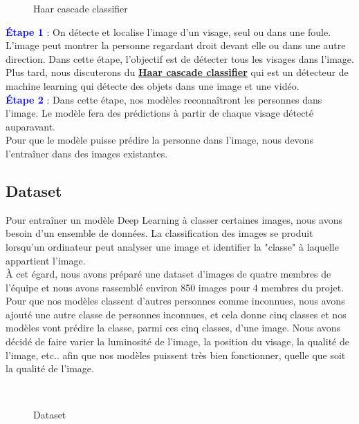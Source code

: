 {%
\begin{figure}
\centering
{}
\caption{Haar cascade classifier}
\label{fig:figure3}
\end{figure} 
\textbf{\textcolor{blue}{Étape 1}} : On détecte et localise l'image d'un visage, seul ou dans une foule. L'image peut montrer la personne regardant droit devant elle ou dans une autre direction. Dans cette étape, l'objectif est de détecter tous les visages dans l'image. Plus tard, nous discuterons du \textbf{\hyperref[sec:haar]{Haar cascade classifier}} qui est un détecteur de machine learning qui détecte des objets dans une image et une vidéo.\\[1.5cm]

\textbf{\textcolor{blue}{Étape 2}} : Dans cette étape, nos modèles reconnaîtront les personnes dans l'image. Le modèle fera des prédictions à partir de chaque visage détecté auparavant.\\


Pour que le modèle puisse prédire la personne dans l'image, nous devons l'entraîner dans des images existantes.


\subsection{Dataset}
Pour entraîner un modèle Deep Learning à classer certaines images, nous avons besoin d'un ensemble de données. La classification des images se produit lorsqu'un ordinateur peut analyser une image et identifier la "classe" à laquelle appartient l'image.\\

À cet égard, nous avons préparé une dataset d'images de quatre membres de l'équipe et nous avons rassemblé environ 850 images pour 4 membres du projet. Pour que nos modèles classent d'autres personnes comme inconnues, nous avons ajouté une autre classe de personnes inconnues, et cela donne cinq classes et nos modèles vont prédire la classe, parmi ces cinq classes, d'une image. Nous avons décidé de faire varier la luminosité de l'image, la position du visage, la qualité de l'image, etc.. afin que nos modèles puissent très bien fonctionner, quelle que soit la qualité de l'image.
\begin{figure}[H] 
\centering
{}\\[0.5cm]
\caption{Dataset}
\label{fig:figure4}
\end{figure}

}
